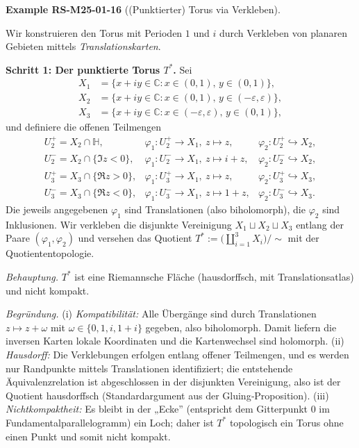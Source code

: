 \documentclass[10pt, letterpaper]{article}
\newcommand{\C}{\mathbb{C}}
\newcommand{\CustomHeading}[3]{%
  \par\medskip\noindent%
  \textbf{#1 #2} \textnormal{(#3)}.\enskip%
}
\newenvironment{EXA}[2]{\begin{unitbox}\CustomHeading{Example}{#1}{#2}}{\end{unitbox}}
\begin{document}
\begin{EXA}{RS-M25-01-16}{(Punktierter) Torus via Verkleben}
Wir konstruieren den Torus mit Perioden $1$ und $i$ durch Verkleben von planaren
Gebieten mittels \emph{Translationskarten}.

\textbf{Schritt 1: Der punktierte Torus $T^*$.}
Sei
\[
\begin{aligned}
X_1&=\{x+iy\in\C: x\in(0,1),\,y\in(0,1)\},\\
X_2&=\{x+iy\in\C: x\in(0,1),\,y\in(-\varepsilon,\varepsilon)\},\\
X_3&=\{x+iy\in\C: x\in(-\varepsilon,\varepsilon),\,y\in(0,1)\},
\end{aligned}
\]
und definiere die offenen Teilmengen
\[
\begin{array}{lll}
U_2^+=X_2\cap\mathbb{H}, & \varphi_1:U_2^+\to X_1,\ z\mapsto z, & \varphi_2:U_2^+\hookrightarrow X_2,\\
U_2^-=X_2\cap\{\Im z<0\}, & \varphi_1:U_2^-\to X_1,\ z\mapsto i+z, & \varphi_2:U_2^-\hookrightarrow X_2,\\
U_3^+=X_3\cap\{\Re z>0\}, & \varphi_1:U_3^+\to X_1,\ z\mapsto z, & \varphi_2:U_3^+\hookrightarrow X_3,\\
U_3^-=X_3\cap\{\Re z<0\}, & \varphi_1:U_3^-\to X_1,\ z\mapsto 1+z, & \varphi_2:U_3^-\hookrightarrow X_3.
\end{array}
\]
Die jeweils angegebenen $\varphi_1$ sind Translationen (also biholomorph), die $\varphi_2$
sind Inklusionen. Wir verkleben die disjunkte Vereinigung $X_1\sqcup X_2\sqcup X_3$
entlang der Paare $(\varphi_1,\varphi_2)$ und versehen das Quotient
$T^*:=\bigl(\coprod_{i=1}^3 X_i\bigr)/\!\sim$ mit der Quotiententopologie.

\textit{Behauptung.} $T^*$ ist eine Riemannsche Fläche (hausdorffsch, mit
Translationsatlas) und nicht kompakt.

\textit{Begründung.} (i) \emph{Kompatibilität:} Alle Übergänge sind durch
Translationen $z\mapsto z+\omega$ mit $\omega\in\{0,1,i,1+i\}$ gegeben, also
biholomorph. Damit liefern die inversen Karten lokale Koordinaten und die
Kartenwechsel sind holomorph. (ii) \emph{Hausdorff:} Die Verklebungen erfolgen
entlang offener Teilmengen, und es werden nur Randpunkte mittels Translationen
identifiziert; die entstehende Äquivalenzrelation ist abgeschlossen in der disjunkten
Vereinigung, also ist der Quotient hausdorffsch (Standardargument aus der
Gluing‐Proposition). (iii) \emph{Nichtkompaktheit:} Es bleibt in der „Ecke”
(entspricht dem Gitterpunkt $0$ im Fundamentalparallelogramm) ein Loch; daher ist
$T^*$ topologisch ein Torus ohne einen Punkt und somit nicht kompakt.


\end{EXA}
\end{document}
